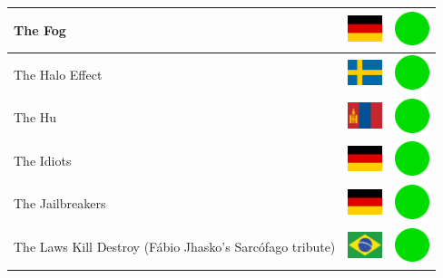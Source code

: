 \documentclass[12pt, a4paper, twoside]{report}
\begin{document}
\begin{center}
\begin{longtable}{|p{5cm}|p{2cm}|p{2cm}|}
The Fog & \includegraphics[width=1cm]{4x3/de} & \includegraphics[width=1cm]{likes/y} \\ \hline
The Halo Effect & \includegraphics[width=1cm]{4x3/se} & \includegraphics[width=1cm]{likes/y} \\ \hline
The Hu & \includegraphics[width=1cm]{4x3/mn} & \includegraphics[width=1cm]{likes/y} \\ \hline
The Idiots & \includegraphics[width=1cm]{4x3/de} & \includegraphics[width=1cm]{likes/y} \\ \hline
The Jailbreakers & \includegraphics[width=1cm]{4x3/de} & \includegraphics[width=1cm]{likes/y} \\ \hline
The Laws Kill Destroy (Fábio Jhasko's Sarcófago tribute) & \includegraphics[width=1cm]{4x3/br} & \includegraphics[width=1cm]{likes/y} \\ \hline

\end{longtable}
\end{center}
\end{document}
